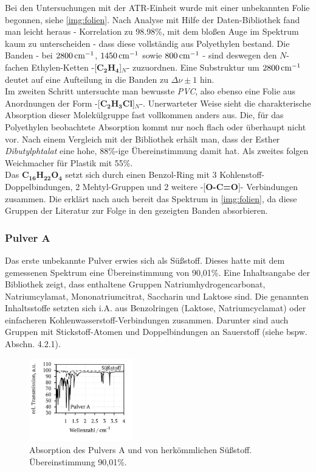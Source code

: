 \documentclass[a4paper,10pt,twocolumn]{article}
\newcommand{\tilt}[1]{\textit{#1}}
\newcommand{\fett}[1]{\textbf{#1}}
\begin{document}
		Bei den Untersuchungen mit der ATR-Einheit wurde mit einer unbekannten Folie begonnen, siehe \autoref{img:folien}. Nach Analyse mit Hilfe der Daten-Bibliothek fand man leicht heraus - Korrelation zu 98.98\%, mit dem blo{\ss}en Auge im Spektrum kaum zu unterscheiden - dass diese vollst\"andig aus Polyethylen bestand. Die Banden - bei $\unit[2800]{cm^{-1}}$, $\unit[1450]{cm^{-1}}$ sowie $\unit[800]{cm^{-1}}$ - sind deswegen den $N$-fachen Ethylen-Ketten -[\fett{C}$_{\fett{2}}$\fett{H}$_{\fett{4}}$]$_{N}$- zuzuordnen. Eine Substruktur um $\unit[2800]{cm^{-1}}$ deutet auf eine Aufteilung in die Banden zu $\Delta\nu\pm1$ hin.\\
		Im zweiten Schritt untersuchte man bewusste \tilt{PVC}, also ebenso eine Folie aus Anordnungen der Form -[\fett{C}$_{\fett{2}}$\fett{H}$_{\fett{3}}$\fett{Cl}]$_{N}$-. Unerwarteter Weise sieht die charakterische Absorption dieser Molek\"ulgruppe fast vollkommen anders aus. Die, f\"ur das Polyethylen beobachtete Absorption kommt nur noch flach oder \"uberhaupt nicht vor. Nach einem Vergleich mit der Bibliothek erh\"alt man, dass der Esther \tilt{Dibutylphtalat} eine hohe, 88\%-ige \"Ubereinstimmung damit hat. Als zweites folgen Weichmacher f\"ur Plastik mit 55\%.\\
		Das \fett{C}$_{\fett{16}}$\fett{H}$_{\fett{22}}$\fett{O}$_{\fett{4}}$ setzt sich durch einen Benzol-Ring mit 3 Kohlenstoff-Doppelbindungen, 2 Mehtyl-Gruppen und 2 weitere -[\fett{O-C=O}]- Verbindungen zusammen. Die erkl\"art nach \cite{FTIRAnl} auch bereit das Spektrum in \autoref{img:folien}, da diese Gruppen der Literatur zur Folge in den gezeigten Banden absorbieren.
		
		\subsubsection{Pulver A}

		Das erste unbekannte Pulver erwies sich als S\"u{\ss}stoff. Dieses hatte mit dem gemessenen Spektrum eine \"Ubereinstimmung von 90,01\%. Eine Inhaltsangabe der Bibliothek zeigt, dass enthaltene Gruppen Natriumhydrogencarbonat, Natriumcylamat, Mononatriumcitrat, Saccharin und Laktose sind. Die genannten Inhaltsstoffe setzten sich i.A. aus Benzolringen (Laktose, Natriumcyclamat) oder einfacheren Kohlenwasserstoff-Verbindungen zusammen. Darunter sind auch Gruppen mit Stickstoff-Atomen und Doppelbindungen an Sauerstoff (siehe bspw. Abschn. 4.2.1). 

			\begin{figure}[h]
			\centering
				\includegraphics[width=0.4\textwidth]{Gruppe2A/pulver_a.pdf}
				\caption{Absorption des Pulvers A und von herk\"ommlichen S\"u{\ss}stoff. \"Ubereinstimmung 90,01\%.}
				\label{img:a}
			\end{figure}
\end{document}
